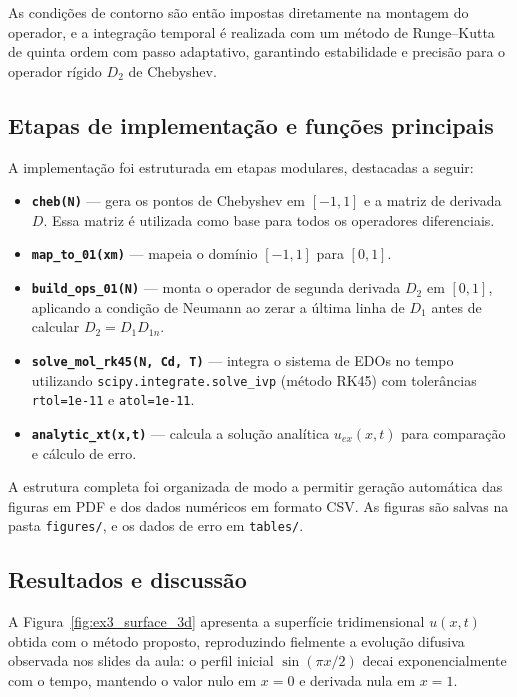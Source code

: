 \documentclass[12pt,a4paper]{article}
\begin{document}
As condições de contorno são então impostas diretamente na montagem do operador, e a integração temporal é realizada com um método de Runge–Kutta de quinta ordem com passo adaptativo, garantindo estabilidade e precisão para o operador rígido $D_2$ de Chebyshev.

\subsection{Etapas de implementação e funções principais}

A implementação foi estruturada em etapas modulares, destacadas a seguir:

\begin{itemize}
    \item \textbf{\texttt{cheb(N)}} — gera os pontos de Chebyshev em $[-1,1]$ e a matriz de derivada $D$. Essa matriz é utilizada como base para todos os operadores diferenciais.
    \item \textbf{\texttt{map\_to\_01(xm)}} — mapeia o domínio $[-1,1]$ para $[0,1]$.
    \item \textbf{\texttt{build\_ops\_01(N)}} — monta o operador de segunda derivada $D_2$ em $[0,1]$, aplicando a condição de Neumann ao zerar a última linha de $D_1$ antes de calcular $D_2 = D_1 D_{1n}$.
    \item \textbf{\texttt{solve\_mol\_rk45(N, Cd, T)}} — integra o sistema de EDOs no tempo utilizando \texttt{scipy.integrate.solve\_ivp} (método RK45) com tolerâncias \texttt{rtol=1e-11} e \texttt{atol=1e-11}.
    \item \textbf{\texttt{analytic\_xt(x,t)}} — calcula a solução analítica $u_{ex}(x,t)$ para comparação e cálculo de erro.
\end{itemize}

A estrutura completa foi organizada de modo a permitir geração automática das figuras em PDF e dos dados numéricos em formato CSV. As figuras são salvas na pasta \texttt{figures/}, e os dados de erro em \texttt{tables/}.

\subsection{Resultados e discussão}

A Figura~\ref{fig:ex3_surface_3d} apresenta a superfície tridimensional $u(x,t)$ obtida com o método proposto, reproduzindo fielmente a evolução difusiva observada nos slides da aula: o perfil inicial $\sin(\pi x/2)$ decai exponencialmente com o tempo, mantendo o valor nulo em $x=0$ e derivada nula em $x=1$.
\end{document}
